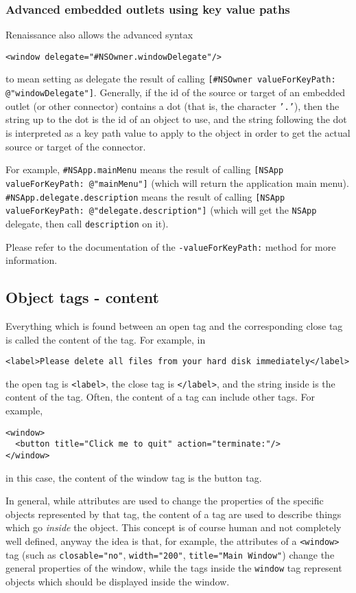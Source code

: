 \subsubsection{Advanced embedded outlets using key value paths}
Renaissance also allows the advanced syntax
\begin{verbatim}
<window delegate="#NSOwner.windowDelegate"/>
\end{verbatim}
to mean setting as delegate the result of calling \texttt{[\#NSOwner
valueForKeyPath: @"windowDelegate"]}.  Generally, if the id of the
source or target of an embedded outlet (or other connector) contains a
dot (that is, the character \texttt{'.'}), then the string up to the
dot is the id of an object to use, and the string following the dot is
interpreted as a key path value to apply to the object in order to get
the actual source or target of the connector.

For example, \texttt{\#NSApp.mainMenu} means the result of calling
\texttt{[NSApp valueForKeyPath: @"mainMenu"]} (which will return
the application main menu).  \texttt{\#NSApp.delegate.description}
means the result of calling \texttt{[NSApp valueForKeyPath:
@"delegate.description"]} (which will get the \texttt{NSApp} delegate,
then call \texttt{description} on it).

Please refer to the documentation of the \texttt{-valueForKeyPath:}
method for more information.

\subsection{Object tags - content}
Everything which is found between an open tag and the corresponding
close tag is called the content of the tag.  For example, in
\begin{verbatim}
<label>Please delete all files from your hard disk immediately</label>
\end{verbatim}
the open tag is \texttt{<label>}, the close tag is \texttt{</label>},
and the string inside is the content of the tag.  Often, the content
of a tag can include other tags.  For example,
\begin{verbatim}
<window>
  <button title="Click me to quit" action="terminate:"/>
</window>
\end{verbatim}
in this case, the content of the window tag is the button tag.

In general, while attributes are used to change the properties of the
specific objects represented by that tag, the content of a tag are
used to describe things which go {\sl inside} the object.  This
concept is of course human and not completely well defined, anyway the
idea is that, for example, the attributes of a \texttt{<window>} tag
(such as \texttt{closable="no"}, \texttt{width="200"},
\texttt{title="Main Window"}) change the general properties of the
window, while the tags inside the \texttt{window} tag represent
objects which should be displayed inside the window.


